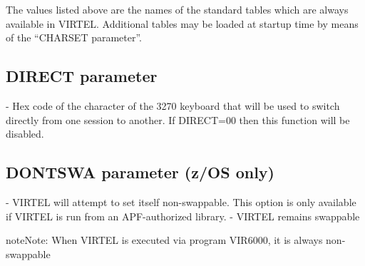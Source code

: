 \documentclass[letterpaper,10pt,english]{sphinxmanual}
\begin{document}
The values listed above are the names of the standard tables which are always available in VIRTEL. Additional tables
may be loaded at startup time by means of the “CHARSET parameter”.

\ignorespaces 

\subsection{DIRECT parameter}
\label{\detokenize{Installation_Guide:direct-parameter}}\label{\detokenize{Installation_Guide:index-53}}
\begin{sphinxVerbatim}[commandchars=\\\{\}]
  
\end{sphinxVerbatim}

 - Hex code of the character of the 3270 keyboard that will be used to switch directly from one session to another. If DIRECT=00 then this function will be disabled.

\ignorespaces 

\subsection{DONTSWA parameter (z/OS only)}
\label{\detokenize{Installation_Guide:dontswa-parameter-z-os-only}}\label{\detokenize{Installation_Guide:index-54}}
\begin{sphinxVerbatim}[commandchars=\\\{\}]
 
\end{sphinxVerbatim}

 - VIRTEL will attempt to set itself non-swappable. This option is only available if VIRTEL is run from an APF-authorized library.
 - VIRTEL remains swappable

\begin{sphinxadmonition}{note}{Note:}
When VIRTEL is executed via program VIR6000, it is always non-swappable
\end{sphinxadmonition}
\end{document}
